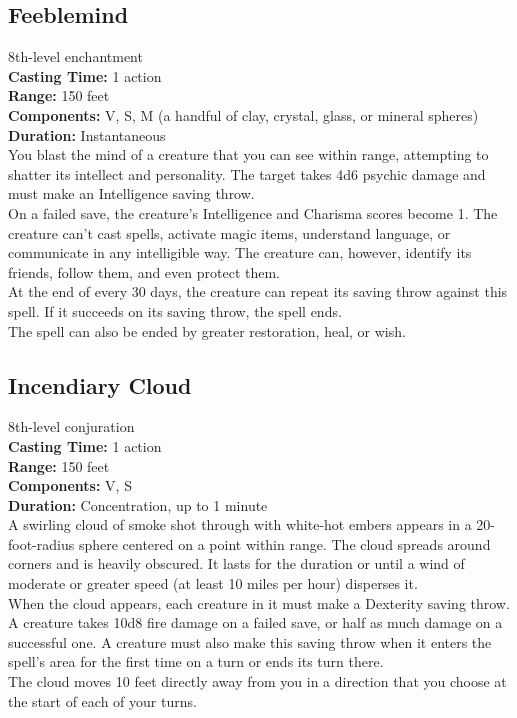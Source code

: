 \documentclass[11pt, A4paper, english]{article}
\begin{document}
		\subsection{Feeblemind}
8th-level enchantment \\
\textbf{Casting Time:} 1 action \\
\textbf{Range:} 150 feet \\
\textbf{Components:} V, S, M (a handful of clay, crystal, glass, or mineral spheres) \\
\textbf{Duration:} Instantaneous \\
You blast the mind of a creature that you can see within range, attempting to shatter its intellect and personality. The target takes 4d6 psychic damage and must make an Intelligence saving throw. \\
On a failed save, the creature’s Intelligence and Charisma scores become 1. The creature can’t cast spells, activate magic items, understand language, or communicate in any intelligible way. The creature can, however, identify its friends, follow them, and even protect them. \\
At the end of every 30 days, the creature can repeat its saving throw against this spell. If it succeeds on its saving throw, the spell ends. \\
The spell can also be ended by greater restoration, heal, or wish.

		\subsection{Incendiary Cloud}
8th-level conjuration \\
\textbf{Casting Time:} 1 action \\
\textbf{Range:} 150 feet \\
\textbf{Components:} V, S \\
\textbf{Duration:} Concentration, up to 1 minute \\
A swirling cloud of smoke shot through with white-hot embers appears in a 20-foot-radius sphere centered on a point within range. The cloud spreads around corners and is heavily obscured. It lasts for the duration or until a wind of moderate or greater speed (at least 10 miles per hour) disperses it. \\
When the cloud appears, each creature in it must make a Dexterity saving throw. A creature takes 10d8 fire damage on a failed save, or half as much damage on a successful one. A creature must also make this saving throw when it enters the spell’s area for the first time on a turn or ends its turn there. \\
The cloud moves 10 feet directly away from you in a direction that you choose at the start of each of your turns.
\end{document}
